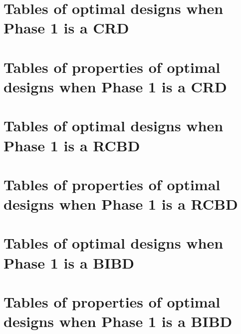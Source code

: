\chapter{Tables of optimal designs when Phase 1 is a CRD} \label{append:optimalCRDDes}



\chapter{Tables of properties of optimal designs when Phase 1 is a CRD} \label{append:optimalCRD}



\chapter{Tables of optimal designs when Phase 1 is a RCBD} \label{append:optimalRBDDes}



\chapter{Tables of properties of optimal designs when Phase 1 is a RCBD} \label{append:optimalRBD}



\chapter{Tables of optimal designs when Phase 1 is a BIBD} \label{append:optimalBIBDDes}



\chapter{Tables of properties of optimal designs when Phase 1 is a BIBD} \label{append:optimalBIBD}




